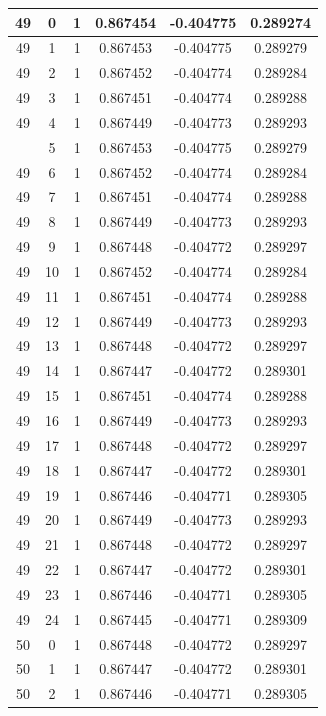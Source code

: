 \documentclass[12pt,a4paper]{article}
\numberwithin{equation}{section}
\numberwithin{figure}{section}
\numberwithin{table}{section}
\begin{document}
\begin{longtable}{|c|c|c|c|c|c|}
49 & 0 & 1 & 0.867454 & -0.404775 & 0.289274 \\ \hline
49 & 1 & 1 & 0.867453 & -0.404775 & 0.289279 \\ \hline
49 & 2 & 1 & 0.867452 & -0.404774 & 0.289284 \\ \hline
49 & 3 & 1 & 0.867451 & -0.404774 & 0.289288 \\ \hline
49 & 4 & 1 & 0.867449 & -0.404773 & 0.289293 \\ \hline
\pagebreak
49 & 5 & 1 & 0.867453 & -0.404775 & 0.289279 \\ \hline
49 & 6 & 1 & 0.867452 & -0.404774 & 0.289284 \\ \hline
49 & 7 & 1 & 0.867451 & -0.404774 & 0.289288 \\ \hline
49 & 8 & 1 & 0.867449 & -0.404773 & 0.289293 \\ \hline
49 & 9 & 1 & 0.867448 & -0.404772 & 0.289297 \\ \hline
49 & 10 & 1 & 0.867452 & -0.404774 & 0.289284 \\ \hline
49 & 11 & 1 & 0.867451 & -0.404774 & 0.289288 \\ \hline
49 & 12 & 1 & 0.867449 & -0.404773 & 0.289293 \\ \hline
49 & 13 & 1 & 0.867448 & -0.404772 & 0.289297 \\ \hline
49 & 14 & 1 & 0.867447 & -0.404772 & 0.289301 \\ \hline
49 & 15 & 1 & 0.867451 & -0.404774 & 0.289288 \\ \hline
49 & 16 & 1 & 0.867449 & -0.404773 & 0.289293 \\ \hline
49 & 17 & 1 & 0.867448 & -0.404772 & 0.289297 \\ \hline
49 & 18 & 1 & 0.867447 & -0.404772 & 0.289301 \\ \hline
49 & 19 & 1 & 0.867446 & -0.404771 & 0.289305 \\ \hline
49 & 20 & 1 & 0.867449 & -0.404773 & 0.289293 \\ \hline
49 & 21 & 1 & 0.867448 & -0.404772 & 0.289297 \\ \hline
49 & 22 & 1 & 0.867447 & -0.404772 & 0.289301 \\ \hline
49 & 23 & 1 & 0.867446 & -0.404771 & 0.289305 \\ \hline
49 & 24 & 1 & 0.867445 & -0.404771 & 0.289309 \\ \hline
50 & 0 & 1 & 0.867448 & -0.404772 & 0.289297 \\ \hline
50 & 1 & 1 & 0.867447 & -0.404772 & 0.289301 \\ \hline
50 & 2 & 1 & 0.867446 & -0.404771 & 0.289305 \\ \hline

\end{longtable}
\end{document}
